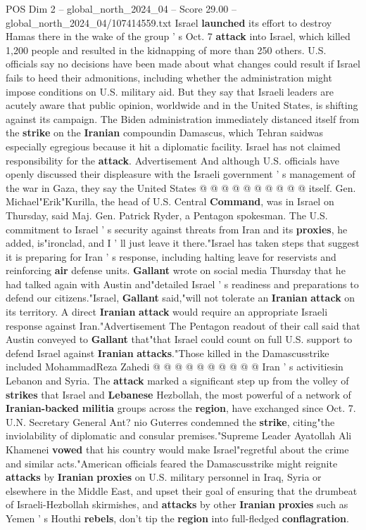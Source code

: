 \begin{textsample}{POS Dim 2 – global\_north\_2024\_04 – Score 29.00 – global\_north\_2024\_04/107414559.txt}
Israel \textbf{launched} its effort to destroy Hamas there in the wake of the group ' s Oct. 7 \textbf{attack} into Israel, which killed 1,200 people and resulted in the kidnapping of more than 250 others.
U.S. officials say no decisions have been made about what changes could result if Israel fails to heed their admonitions, including whether the administration might impose conditions on U.S. military aid.
But they say that Israeli leaders are acutely aware that public opinion, worldwide and in the United States, is shifting against its campaign.
The Biden administration immediately distanced itself from the \textbf{strike} on the \textbf{Iranian} compoundin Damascus, which Tehran saidwas especially egregious because it hit a diplomatic facility.
Israel has not claimed responsibility for the \textbf{attack}.
Advertisement And although U.S. officials have openly discussed their displeasure with the Israeli government ' s management of the war in Gaza, they say the United States @ @ @ @ @ @ @ @ @ @ itself.
Gen.
Michael"Erik"Kurilla, the head of U.S.
Central \textbf{Command}, was in Israel on Thursday, said Maj.
Gen.
Patrick Ryder, a Pentagon spokesman.
The U.S. commitment to Israel ' s security against threats from Iran and its \textbf{proxies}, he added, is"ironclad, and I ' ll just leave it there."Israel has taken steps that suggest it is preparing for Iran ' s response, including halting leave for reservists and reinforcing \textbf{air} defense units. \textbf{Gallant} wrote on social media Thursday that he had talked again with Austin and"detailed Israel ' s readiness and preparations to defend our citizens."Israel, \textbf{Gallant} said,"will not tolerate an \textbf{Iranian} \textbf{attack} on its territory.
A direct \textbf{Iranian} \textbf{attack} would require an appropriate Israeli response against Iran."Advertisement The Pentagon readout of their call said that Austin conveyed to \textbf{Gallant} that"that Israel could count on full U.S. support to defend Israel against \textbf{Iranian} \textbf{attacks}."Those killed in the Damascusstrike included MohammadReza Zahedi @ @ @ @ @ @ @ @ @ @ Iran ' s activitiesin Lebanon and Syria.
The \textbf{attack} marked a significant step up from the volley of \textbf{strikes} that Israel and \textbf{Lebanese} Hezbollah, the most powerful of a network of \textbf{Iranian-backed} \textbf{militia} groups across the \textbf{region}, have exchanged since Oct. 7.
U.N.
Secretary General Ant? nio Guterres condemned the \textbf{strike}, citing"the inviolability of diplomatic and consular premises."Supreme Leader Ayatollah Ali Khamenei \textbf{vowed} that his country would make Israel"regretful about the crime and similar acts."American officials feared the Damascusstrike might reignite \textbf{attacks} by \textbf{Iranian} \textbf{proxies} on U.S. military personnel in Iraq, Syria or elsewhere in the Middle East, and upset their goal of ensuring that the drumbeat of Israeli-Hezbollah skirmishes, and \textbf{attacks} by other \textbf{Iranian} \textbf{proxies} such as Yemen ' s Houthi \textbf{rebels}, don't tip the \textbf{region} into full-fledged \textbf{conflagration}.

\end{textsample}
